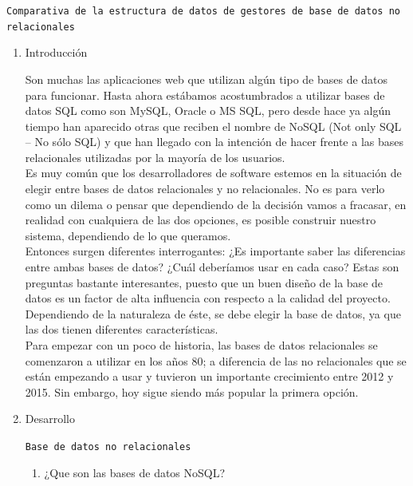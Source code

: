 \documentclass[12pt,a4paper,oneside]{book}
\begin{document}
	
	\newpage
	
	\begin{center}
		\texttt{Comparativa de la estructura de datos de gestores de base de datos no relacionales} 
	\end{center}
	
	\begin{enumerate}
		\item Introducción
		
		Son muchas las aplicaciones web que utilizan algún tipo de bases de datos para funcionar. Hasta ahora estábamos acostumbrados a utilizar bases de datos SQL como son MySQL, Oracle o MS SQL, pero desde hace ya algún tiempo han aparecido otras que reciben el nombre de NoSQL (Not only SQL – No sólo SQL) y que han llegado con la intención de hacer frente a las bases relacionales utilizadas por la mayoría de los usuarios.\\
		
		Es muy común que los desarrolladores de software estemos en la situación de elegir entre bases de datos relacionales y no relacionales. No es para verlo como un dilema o pensar que dependiendo de la decisión vamos a fracasar, en realidad con cualquiera de las dos opciones, es posible construir nuestro sistema, dependiendo de lo que queramos.\\
		
		Entonces surgen diferentes interrogantes: ¿Es importante saber las diferencias entre ambas bases de datos? ¿Cuál deberíamos usar en cada caso? Estas son preguntas bastante interesantes, puesto que un buen diseño de la base de datos es un factor de alta influencia con respecto a la calidad del proyecto. Dependiendo de la naturaleza de éste, se debe elegir la base de datos, ya que las dos tienen diferentes características.\\
		
		Para empezar con  un poco de historia, las bases de datos relacionales se comenzaron a utilizar en los años 80; a diferencia de las no relacionales que se están empezando a usar y tuvieron un importante crecimiento entre 2012 y 2015. Sin embargo, hoy sigue siendo más popular la primera opción.\\
		
		
		\item Desarrollo
		
		\texttt{Base de datos no relacionales} 
		
		\begin{enumerate}
			\item ¿Que son las bases de datos NoSQL?\\
			

\end{enumerate}
\end{enumerate}
\end{document}
